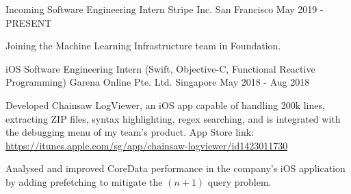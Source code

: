 

\begin{cventries}


  \cventry
  {Incoming Software Engineering Intern} %
  {Stripe Inc.} %
  {San Francisco} %
  {May 2019 - PRESENT} %
  {
    \begin{cvitems}
      \item {Joining the Machine Learning Infrastructure team in Foundation.}
    \end{cvitems}
  }

  \cventry
  {iOS Software Engineering Intern (Swift, Objective-C, Functional Reactive Programming)} %
  {Garena Online Pte. Ltd.} %
  {Singapore} %
  {May 2018 - Aug 2018} %
  {
    \begin{cvitems}
      \item {Developed Chainsaw LogViewer, an iOS app capable of handling 200k lines, extracting ZIP files, syntax highlighting, regex searching, and is integrated with the debugging menu of my team's product. App Store link: \url{https://itunes.apple.com/sg/app/chainsaw-logviewer/id1423011730}}
      \item {Analysed and improved CoreData performance in the company's iOS application by adding prefetching to mitigate the $(n+1)$ query problem.}
    \end{cvitems}
  }


\end{cventries}
